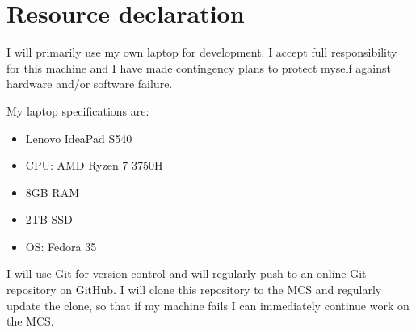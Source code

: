\documentclass[12pt,a4paper]{article}
\begin{document}
\section*{Resource declaration}

I will primarily use my own laptop for development. I accept full responsibility for this machine and I have made contingency plans to protect myself against hardware and/or software failure.

My laptop specifications are:
\begin{itemize}
\item Lenovo IdeaPad S540
\item CPU: AMD Ryzen 7 3750H
\item 8GB RAM
\item 2TB SSD
\item OS: Fedora 35
\end{itemize}

I will use Git for version control and will regularly push to an online Git repository on GitHub. I will clone this repository to the MCS and regularly update the clone, so that if my machine fails I can immediately continue work on the MCS.
\end{document}
